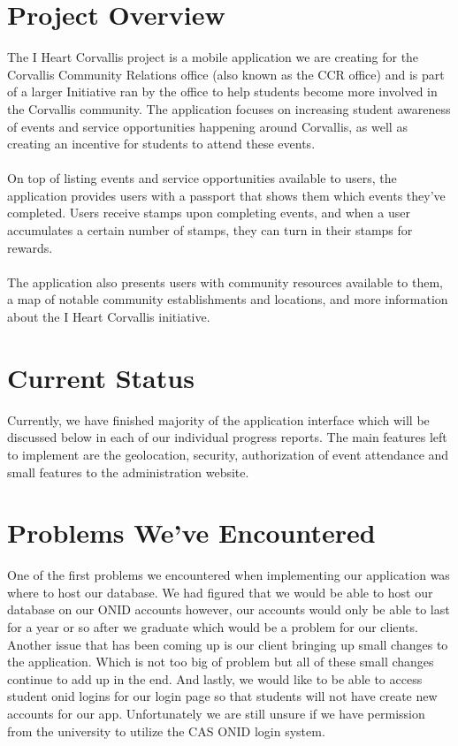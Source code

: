 \documentclass[onecolumn, draftclsnofoot,10pt, compsoc]{IEEEtran}
\begin{document}
\newpage
{}
\tableofcontents
\clearpage

\section{Project Overview}
	The I Heart Corvallis project is a mobile application we are creating for the Corvallis Community Relations office (also known as the CCR office) and is part of a larger Initiative ran by the office to help students become more involved in the Corvallis community. The application focuses on increasing student awareness of events and service opportunities happening around Corvallis, as well as creating an incentive for students to attend these events. \\ \\
	On top of listing events and service opportunities available to users, the application provides users with a passport that shows them which events they’ve completed. Users receive stamps upon completing events, and when a user accumulates a certain number of stamps, they can turn in their stamps for rewards. \\ \\
	The application also presents users with community resources available to them, a map of notable community establishments and locations, and more information about the I Heart Corvallis initiative.

\section{Current Status}
	Currently, we have finished majority of the application interface which will be discussed below in each of our individual progress reports. The main features left to implement are the geolocation, security, authorization of event attendance and small features to the administration website.

\section{Problems We've Encountered}
	One of the first problems we encountered when implementing our application was where to host our database. We had figured that we would be able to host our database on our ONID accounts however, our accounts would only be able to last for a year or so after we graduate which would be a problem for our clients. Another issue that has been coming up is our client bringing up small changes to the application. Which is not too big of problem but all of these small changes continue to add up in the end. And lastly, we would like to be able to access student onid logins for our login page so that students will not have create new accounts for our app. Unfortunately we are still unsure if we have permission from the university to utilize the CAS ONID login system.
\end{document}
